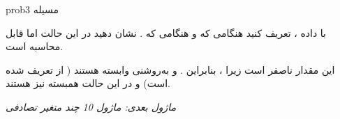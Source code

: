 \begin{PSbox}[unbreakable]{prob}{مسیله 3}

با داده ، تعریف کنید  هنگامی که  و  هنگامی که . نشان دهید در این حالت  اما  قابل محاسبه است.

\PSsolution{} \PSbr{}\PSbr{}این مقدار ناصفر است زیرا ، بنابراین .\PSbr{} و  به‌روشنی وابسته هستند ( از  تعریف شده است) و در این حالت همبسته نیز هستند.

\emph{ماژول بعدی: {ماژول 10  چند متغیر تصادفی}}

\end{PSbox}
